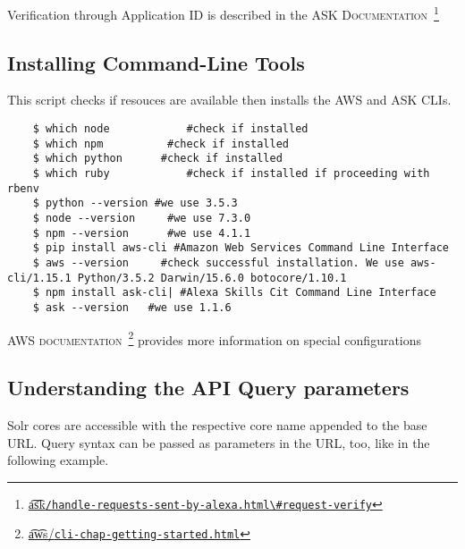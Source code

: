 Verification through Application ID is described in the \textsc{ASK Documentation}~\footnote{\href{https://developer.amazon.com/docs/custom-skills/handle-requests-sent-by-alexa.html\#request-verify}{\t{a\t{sk}}\lstinline|/handle-requests-sent-by-alexa.html\#request-verify|}}


%
%
%
%	


\subsection*{Installing Command-Line Tools}
This script %
checks if resouces are available then installs the AWS and ASK CLIs.

\begin{verbatim}
	$ which node			#check if installed
	$ which npm			 #check if installed
	$ which python		#check if installed
	$ which ruby			#check if installed if proceeding with rbenv
	$ python --version #we use 3.5.3
	$ node --version	 #we use 7.3.0
	$ npm --version 	 #we use 4.1.1
	$ pip install aws-cli #Amazon Web Services Command Line Interface
	$ aws --version		#check successful installation. We use aws-cli/1.15.1 Python/3.5.2 Darwin/15.6.0 botocore/1.10.1
	$ npm install ask-cli| #Alexa Skills Cit Command Line Interface
	$ ask --version	  #we use 1.1.6
\end{verbatim}


\textsc{AWS documentation}~\footnote{\href{https://docs.aws.amazon.com/cli/latest/userguide/cli-chap-getting-started.html}{\t{a\t{ws}}/\lstinline|cli-chap-getting-started.html|}} provides more information on special configurations





\subsection*{Understanding the API Query parameters}
Solr cores are accessible with the respective core name appended to the base URL.
Query syntax can be passed as parameters in the URL, too, like in the following example.



